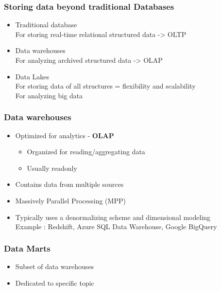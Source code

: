 \subsubsection{Storing data beyond traditional Databases}
\begin{itemize}
    \item Traditional database \\
    For storing real-time relational structured data -> OLTP
    \item Data warehouses \\
    For analyzing archived structured data -> OLAP
    \item Data Lakes \\
    For storing data of all structures = flexibility and scalability \\
    For analyzing big data
\end{itemize}

\subsubsection{Data warehouses}
\begin{itemize}
    \item Optimized for analytics - \textbf{OLAP}
    \begin{itemize}
        \item Organized for reading/aggregating data
        \item Usually readonly
    \end{itemize}
    \item Contains data from multiple sources
    \item Massively Parallel Processing (MPP)
    \item Typically uses a denormalizing scheme and dimensional modeling \\
    Example : Redshift, Azure SQL Data Warehouse, Google BigQuery
\end{itemize}

\subsubsection{Data Marts}
\begin{itemize}
    \item Subset of data warehouses
    \item Dedicated to specific topic
\end{itemize}


